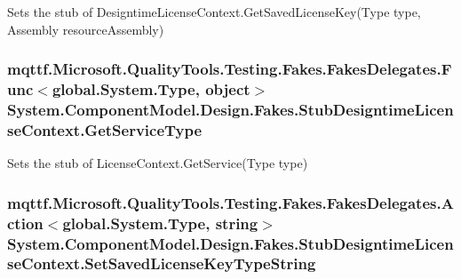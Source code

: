 Sets the stub of Designtime\-License\-Context.\-Get\-Saved\-License\-Key(\-Type type, Assembly resource\-Assembly)

\hypertarget{class_system_1_1_component_model_1_1_design_1_1_fakes_1_1_stub_designtime_license_context_a23e646a8d81d2dbc7c11bd9eba35f238}{
\subsubsection[{Get\-Service\-Type}]{\setlength{\rightskip}{0pt plus 5cm}mqttf.\-Microsoft.\-Quality\-Tools.\-Testing.\-Fakes.\-Fakes\-Delegates.\-Func$<$global.\-System.\-Type, object$>$ System.\-Component\-Model.\-Design.\-Fakes.\-Stub\-Designtime\-License\-Context.\-Get\-Service\-Type}}\label{class_system_1_1_component_model_1_1_design_1_1_fakes_1_1_stub_designtime_license_context_a23e646a8d81d2dbc7c11bd9eba35f238}


Sets the stub of License\-Context.\-Get\-Service(\-Type type)

\hypertarget{class_system_1_1_component_model_1_1_design_1_1_fakes_1_1_stub_designtime_license_context_a5409e3fbe953820204efb0ff43fd4a55}{
\subsubsection[{Set\-Saved\-License\-Key\-Type\-String}]{\setlength{\rightskip}{0pt plus 5cm}mqttf.\-Microsoft.\-Quality\-Tools.\-Testing.\-Fakes.\-Fakes\-Delegates.\-Action$<$global.\-System.\-Type, string$>$ System.\-Component\-Model.\-Design.\-Fakes.\-Stub\-Designtime\-License\-Context.\-Set\-Saved\-License\-Key\-Type\-String}}\label{class_system_1_1_component_model_1_1_design_1_1_fakes_1_1_stub_designtime_license_context_a5409e3fbe953820204efb0ff43fd4a55}


